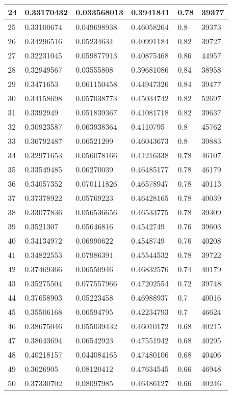 \begin{longtable}{|l|l|l|l|l|l|}
24 & 0.33170432 & 0.033568013 & 0.3941841 & 0.78 & 39377 \\ \hline 
25 & 0.33100674 & 0.049698938 & 0.46058264 & 0.8 & 39373 \\ \hline 
26 & 0.34296516 & 0.05234634 & 0.40991184 & 0.82 & 39727 \\ \hline 
27 & 0.32231045 & 0.059877913 & 0.40875468 & 0.86 & 44957 \\ \hline 
28 & 0.32949567 & 0.03555808 & 0.39681086 & 0.84 & 38958 \\ \hline 
29 & 0.3471653 & 0.061150458 & 0.44947326 & 0.84 & 39477 \\ \hline 
30 & 0.34158698 & 0.057038773 & 0.45034742 & 0.82 & 52697 \\ \hline 
31 & 0.3392949 & 0.051839367 & 0.41081718 & 0.82 & 39637 \\ \hline 
32 & 0.30923587 & 0.063938364 & 0.4110795 & 0.8 & 45762 \\ \hline 
33 & 0.36792487 & 0.06521209 & 0.46043673 & 0.8 & 39883 \\ \hline 
34 & 0.32971653 & 0.056078166 & 0.41216338 & 0.78 & 46107 \\ \hline 
35 & 0.33549485 & 0.06270039 & 0.46485177 & 0.78 & 46179 \\ \hline 
36 & 0.34057352 & 0.070111826 & 0.46578947 & 0.78 & 40113 \\ \hline 
37 & 0.37378922 & 0.05769223 & 0.46428165 & 0.78 & 40039 \\ \hline 
38 & 0.33077836 & 0.056536656 & 0.46533775 & 0.78 & 39309 \\ \hline 
39 & 0.3521307 & 0.05646816 & 0.4542749 & 0.76 & 39603 \\ \hline 
40 & 0.34134972 & 0.06990622 & 0.4548749 & 0.76 & 40208 \\ \hline 
41 & 0.34822553 & 0.07986391 & 0.45544532 & 0.78 & 39722 \\ \hline 
42 & 0.37469366 & 0.06550946 & 0.46832576 & 0.74 & 40179 \\ \hline 
43 & 0.35275504 & 0.077557966 & 0.47202554 & 0.72 & 39748 \\ \hline 
44 & 0.37658903 & 0.05223458 & 0.46988937 & 0.7 & 40016 \\ \hline 
45 & 0.35506168 & 0.06594795 & 0.42234793 & 0.7 & 46624 \\ \hline 
46 & 0.38675046 & 0.055039432 & 0.46010172 & 0.68 & 40215 \\ \hline 
47 & 0.38643694 & 0.06542923 & 0.47551942 & 0.68 & 40295 \\ \hline 
48 & 0.40218157 & 0.044084165 & 0.47480106 & 0.68 & 40406 \\ \hline 
49 & 0.3626905 & 0.08120412 & 0.47634545 & 0.66 & 46948 \\ \hline 
50 & 0.37330702 & 0.08097985 & 0.46486127 & 0.66 & 40246 \\ \hline 
\end{longtable}